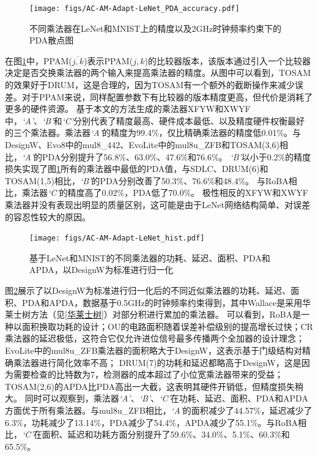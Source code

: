\begin{figure}[!h]
    \centering
    \texttt{[image: figs/AC-AM-Adapt-LeNet\_PDA\_accuracy.pdf]}
    \caption{不同乘法器在LeNet和MNIST上的精度以及2GHz时钟频率约束下的PDA散点图}
    \label{AC:AM:Adapt:Fig:LeNet_PDA_accuracy}
\end{figure}

在图\ref{AC:AM:Adapt:Fig:LeNet_PDA_accuracy}中，PPAM($\overline{j,k}$)表示PPAM($j,k$)的比较器版本，该版本通过引入一个比较器决定是否交换乘法器的两个输入来提高乘法器的精度。从图中可以看到，TOSAM的效果好于DRUM，这是合理的，因为TOSAM有一个额外的截断操作来减少误差。对于PPAM来说，同样配置参数下有比较器的版本精度更高，但代价是消耗了更多的硬件资源。
基于本文的方法生成的乘法器XFYW和XWYF中，\emph{`A'}、\emph{`B'}和\emph{`C'}分别代表了精度最高、硬件成本最低、以及精度硬件权衡最好的三个乘法器。乘法器\emph{`A'}的精度为99.4\%，仅比精确乘法器的精度低0.01\%。与DesignW、Evo8中的mul8\_442、EvoLite中的mul8u\_ZFB和TOSAM(3,6)相比，\emph{`A'}的PDA分别提升了56.8\%、63.0\%、47.6\%和76.6\%。
\emph{`B'}以小于0.2\%的精度损失实现了图\ref{AC:AM:Adapt:Fig:LeNet_PDA_accuracy}所有的乘法器中最低的PDA值，与SDLC、DRUM(6)和TOSAM(1,5)相比，\emph{`B'}的PDA分别改善了50.3\%、76.6\%和48.4\%。
与RoBA相比，乘法器\emph{`C'}的精度高了0.02\%，PDA低了70.0\%。
极性相反的XFYW和XWYF乘法器并没有表现出明显的质量区别，这可能是由于LeNet网络结构简单、对误差的容忍性较大的原因。

\begin{figure}[!h]
    \centering
    \texttt{[image: figs/AC-AM-Adapt-LeNet\_hist.pdf]}
    \caption{基于LeNet和MNIST的不同乘法器的功耗、延迟、面积、PDA和APDA，以DesignW为标准进行归一化}
    \label{AC:AM:Adapt:Fig:LeNet_hist}
\end{figure}

图\ref{AC:AM:Adapt:Fig:LeNet_hist}展示了以DesignW为标准进行归一化后的不同近似乘法器的功耗、延迟、面积、PDA和APDA，数据基于0.5GHz的时钟频率约束得到，其中Wallace是采用华莱士树方法（见\ref{华莱士树}）对部分积进行累加的乘法器。
可以看到，RoBA是一种以面积换取功耗的设计；OU的电路面积随着误差补偿级别的提高增长过快；CR乘法器的延迟极低，这符合它仅允许进位信号最多传播两个全加器的设计理念；EvoLite中的mul8u\_ZFB乘法器的面积略大于DesignW，这表示基于门级结构对精确乘法器进行简化效率不高；
DRUM(7)的功耗和延迟都略高于DesignW，这是因为需要检查的比特数为7，检测器的成本超过了小位宽乘法器带来的受益；TOSAM(2,6)的APDA比PDA高出一大截，这表明其硬件开销低，但精度损失稍大。
同时可以观察到，乘法器\emph{`A'}、\emph{`B'}、\emph{`C'}在功耗、延迟、面积、PDA和APDA方面优于所有乘法器。与mul8u\_ZFB相比，\emph{`A'}的面积减少了44.57\%，延迟减少了6.3\%，功耗减少了13.14\%，PDA减少了54.4\%，APDA减少了55.1\%。与RoBA相比，\emph{`C'}在面积、延迟和功耗方面分别提升了59.6\%、34.0\%、5.1\%、60.3\%和65.5\%。

